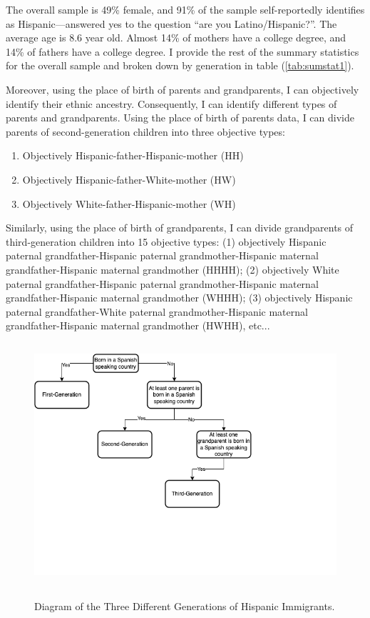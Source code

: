 \documentclass[12pt,english]{article}
\begin{document}
The overall sample is 49\% female, and 91\% of the sample self-reportedly identifies as Hispanic---answered yes to the question ``are you Latino/Hispanic?''. The average age is 8.6 year old. Almost 14\% of mothers have a college degree, and 14\% of fathers have a college degree. I provide the rest of the summary statistics for the overall sample and broken down by generation in table (\ref{tab:sumstat1}). 




Moreover, using the place of birth of parents and grandparents, I can objectively identify their ethnic ancestry. Consequently, I can identify different types of parents and grandparents. Using the place of birth of parents data, I can divide parents of second-generation children into three objective types: 
\begin{enumerate}
\item Objectively Hispanic-father-Hispanic-mother (HH)
\item Objectively Hispanic-father-White-mother (HW)
\item Objectively White-father-Hispanic-mother (WH)
\end{enumerate}

Similarly, using the place of birth of grandparents, I can divide grandparents of third-generation children into 15 objective types: (1) objectively Hispanic paternal grandfather-Hispanic paternal grandmother-Hispanic maternal grandfather-Hispanic maternal grandmother (HHHH); (2) objectively White paternal grandfather-Hispanic paternal grandmother-Hispanic maternal grandfather-Hispanic maternal grandmother (WHHH); (3) objectively Hispanic paternal grandfather-White paternal grandmother-Hispanic maternal grandfather-Hispanic maternal grandmother (HWHH), etc...


\begin{center}
\begin{figure}[H]
\caption{Diagram of the Three Different Generations of Hispanic Immigrants.}
\includegraphics[width=\textwidth, height=9cm]{figure/diag.png} 
\label{fig:diag}
\end{figure}
\hfill%
\end{center}
\end{document}
